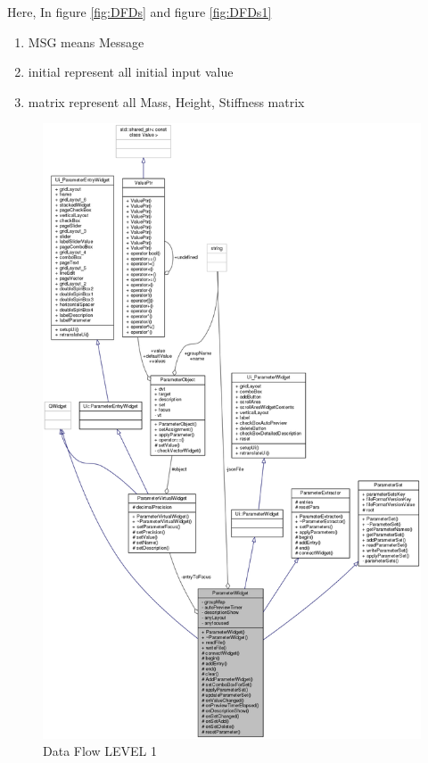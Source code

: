Here, In figure \ref{fig:DFDs} and figure \ref{fig:DFDs1}
\begin{enumerate}
\item MSG means Message
\item initial represent all initial input value
\item matrix represent all Mass, Height, Stiffness matrix
\end{enumerate}
\begin{figure}
\centering
\includegraphics[scale=0.40]{images/collaborative}
\caption{Data Flow LEVEL 1}
\label{fig:collaborative}
\end{figure}

